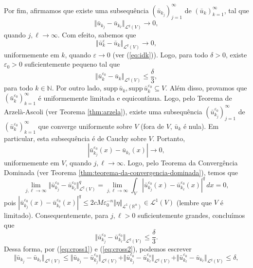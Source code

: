 \documentclass[a4paper, 11pt]{book}
\theoremstyle{definition}
\newcommand{\bN}{\mathbb{N}}
\newcommand{\bR}{\mathbb{R}}
\newcommand{\cL}{\mathcal{L}}
\newcommand{\supp}{\mathrm{supp}\,}
\begin{document}
\begin{prf}
    Por fim, afirmamos que existe uma subsequência $(\bar u_{k_j})_{j=1}^\infty$ de $(\bar u_k)_{k=1}^\infty$, tal que
    \[
        \Vert \bar u_{k_j} - \bar u_{k_\ell} \Vert_{\cL^q(V)} \to 0,
    \]
    quando $j,\ell \to \infty$.
    Com efeito, sabemos que
    \[
        \Vert \bar u_k^\varepsilon - \bar u_k \Vert_{\cL^q(V)} \to 0,
    \]
    uniformemente em $k$, quando $\varepsilon \to 0$ (ver (\ref{eq:idk})).
    Logo, para todo $\delta > 0$, existe $\varepsilon_0 > 0$ suficientemente pequeno tal que
    \begin{equation} \label{eq:cross1}
        \Vert \bar u_k^{\varepsilon_0} - \bar u_k \Vert_{\cL^q(V)} \leqslant \frac{\delta}{3},
    \end{equation}
    para todo $k \in \bN$.
    Por outro lado, $\supp \bar u_k, \supp \bar u_k^{\varepsilon_0} \subseteq V$. Além disso, provamos que $(\bar u_k^{\varepsilon_0})_{k=1}^\infty$ é uniformemente limitada e equicontínua.
    Logo, pelo Teorema de Arzelà-Ascoli (ver Teorema \ref{thm:arzela}), existe uma subsequência $(\bar u_{k_j}^{\varepsilon_0})_{j=1}^\infty$ de $(\bar u_k^{\varepsilon_0})_{k=1}^\infty$ que converge uniformente sobre $V$ (fora de $V$, $\bar u_k$ é nula). Em particular, esta subsequência é de Cauchy sobre $V$.
    Portanto,
    \[
        |\bar u_{k_j}^{\varepsilon_0}(x) - \bar u_{k_\ell}(x)| \to 0,
    \]
    uniformemente em $V$, quando $j,\ell \to \infty$.
    Logo, pelo Teorema da Convergência Dominada (ver Teorema \ref{thm:teorema-da-convergencia-dominada}), temos que
    \[
        \lim_{j,\ell \to \infty} \Vert \bar u_{k_j}^{\varepsilon_0} - \bar u_{k_\ell}^{\varepsilon_0} \Vert_{\cL^q(V)}^q = \lim_{j,\ell \to \infty} \int_V | \bar u_{k_j}^{\varepsilon_0}(x) - \bar u_{k_\ell}^{\varepsilon_0}(x)|^q \,dx = 0,
    \]
    pois $| \bar u_{k_j}^{\varepsilon_0}(x) - \bar u_{k_\ell}^{\varepsilon_0}(x)|^q \leqslant 2 cM \varepsilon_0^{-n} \Vert \eta \Vert_{\cL^1(\bR^n)} \in \cL^1(V)$ (lembre que $V$ é limitado).
    Consequentemente, para $j,\ell > 0$ suficientemente grandes, concluímos que
    \begin{equation} \label{eq:cross2}
        \Vert \bar u_{k_j}^{\varepsilon_0} - \bar u_{k_\ell}^{\varepsilon_0} \Vert_{\cL^q(V)} \leqslant \frac{\delta}{3}.
    \end{equation}
    Dessa forma, por (\ref{eq:cross1}) e (\ref{eq:cross2}), podemos escrever
    \[
        \Vert \bar u_{k_j} - \bar u_{k_\ell} \Vert_{\cL^q(V)} \leqslant \Vert \bar u_{k_j} - \bar u_{k_j}^{\varepsilon_0} \Vert_{\cL^q(V)} + \Vert \bar u_{k_j}^{\varepsilon_0} - \bar u_{k_\ell}^{\varepsilon_0} \Vert_{\cL^q(V)} + \Vert \bar u_{k_\ell}^{\varepsilon_0} - \bar u_{k_\ell} \Vert_{\cL^q(V)} \leqslant \delta,
\]
\end{prf}
\end{document}
